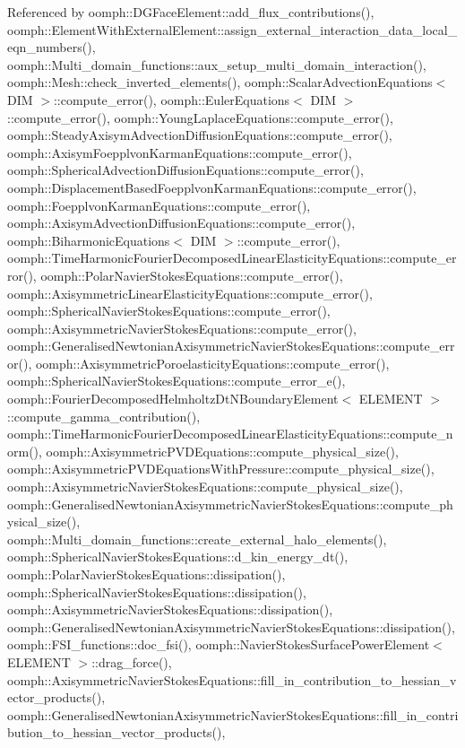 Referenced by oomph\+::\+D\+G\+Face\+Element\+::add\+\_\+flux\+\_\+contributions(), oomph\+::\+Element\+With\+External\+Element\+::assign\+\_\+external\+\_\+interaction\+\_\+data\+\_\+local\+\_\+eqn\+\_\+numbers(), oomph\+::\+Multi\+\_\+domain\+\_\+functions\+::aux\+\_\+setup\+\_\+multi\+\_\+domain\+\_\+interaction(), oomph\+::\+Mesh\+::check\+\_\+inverted\+\_\+elements(), oomph\+::\+Scalar\+Advection\+Equations$<$ D\+I\+M $>$\+::compute\+\_\+error(), oomph\+::\+Euler\+Equations$<$ D\+I\+M $>$\+::compute\+\_\+error(), oomph\+::\+Young\+Laplace\+Equations\+::compute\+\_\+error(), oomph\+::\+Steady\+Axisym\+Advection\+Diffusion\+Equations\+::compute\+\_\+error(), oomph\+::\+Axisym\+Foepplvon\+Karman\+Equations\+::compute\+\_\+error(), oomph\+::\+Spherical\+Advection\+Diffusion\+Equations\+::compute\+\_\+error(), oomph\+::\+Displacement\+Based\+Foepplvon\+Karman\+Equations\+::compute\+\_\+error(), oomph\+::\+Foepplvon\+Karman\+Equations\+::compute\+\_\+error(), oomph\+::\+Axisym\+Advection\+Diffusion\+Equations\+::compute\+\_\+error(), oomph\+::\+Biharmonic\+Equations$<$ D\+I\+M $>$\+::compute\+\_\+error(), oomph\+::\+Time\+Harmonic\+Fourier\+Decomposed\+Linear\+Elasticity\+Equations\+::compute\+\_\+error(), oomph\+::\+Polar\+Navier\+Stokes\+Equations\+::compute\+\_\+error(), oomph\+::\+Axisymmetric\+Linear\+Elasticity\+Equations\+::compute\+\_\+error(), oomph\+::\+Spherical\+Navier\+Stokes\+Equations\+::compute\+\_\+error(), oomph\+::\+Axisymmetric\+Navier\+Stokes\+Equations\+::compute\+\_\+error(), oomph\+::\+Generalised\+Newtonian\+Axisymmetric\+Navier\+Stokes\+Equations\+::compute\+\_\+error(), oomph\+::\+Axisymmetric\+Poroelasticity\+Equations\+::compute\+\_\+error(), oomph\+::\+Spherical\+Navier\+Stokes\+Equations\+::compute\+\_\+error\+\_\+e(), oomph\+::\+Fourier\+Decomposed\+Helmholtz\+Dt\+N\+Boundary\+Element$<$ E\+L\+E\+M\+E\+N\+T $>$\+::compute\+\_\+gamma\+\_\+contribution(), oomph\+::\+Time\+Harmonic\+Fourier\+Decomposed\+Linear\+Elasticity\+Equations\+::compute\+\_\+norm(), oomph\+::\+Axisymmetric\+P\+V\+D\+Equations\+::compute\+\_\+physical\+\_\+size(), oomph\+::\+Axisymmetric\+P\+V\+D\+Equations\+With\+Pressure\+::compute\+\_\+physical\+\_\+size(), oomph\+::\+Axisymmetric\+Navier\+Stokes\+Equations\+::compute\+\_\+physical\+\_\+size(), oomph\+::\+Generalised\+Newtonian\+Axisymmetric\+Navier\+Stokes\+Equations\+::compute\+\_\+physical\+\_\+size(), oomph\+::\+Multi\+\_\+domain\+\_\+functions\+::create\+\_\+external\+\_\+halo\+\_\+elements(), oomph\+::\+Spherical\+Navier\+Stokes\+Equations\+::d\+\_\+kin\+\_\+energy\+\_\+dt(), oomph\+::\+Polar\+Navier\+Stokes\+Equations\+::dissipation(), oomph\+::\+Spherical\+Navier\+Stokes\+Equations\+::dissipation(), oomph\+::\+Axisymmetric\+Navier\+Stokes\+Equations\+::dissipation(), oomph\+::\+Generalised\+Newtonian\+Axisymmetric\+Navier\+Stokes\+Equations\+::dissipation(), oomph\+::\+F\+S\+I\+\_\+functions\+::doc\+\_\+fsi(), oomph\+::\+Navier\+Stokes\+Surface\+Power\+Element$<$ E\+L\+E\+M\+E\+N\+T $>$\+::drag\+\_\+force(), oomph\+::\+Axisymmetric\+Navier\+Stokes\+Equations\+::fill\+\_\+in\+\_\+contribution\+\_\+to\+\_\+hessian\+\_\+vector\+\_\+products(), oomph\+::\+Generalised\+Newtonian\+Axisymmetric\+Navier\+Stokes\+Equations\+::fill\+\_\+in\+\_\+contribution\+\_\+to\+\_\+hessian\+\_\+vector\+\_\+products(), 